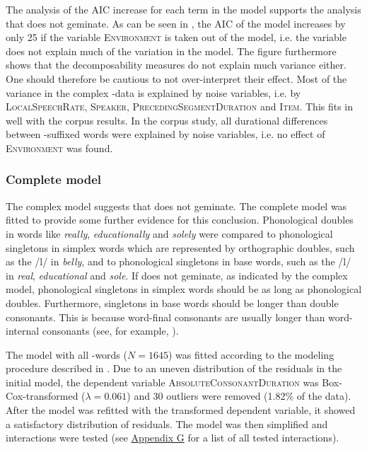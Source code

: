 The analysis of the AIC increase for each term in the model supports the analysis that  does not geminate. As can be seen in , the AIC of the model increases by only 25 if the variable \textsc{Environment} is taken out of the model, i.e. the variable does not explain much of the variation in the model.
The figure furthermore shows that the decomposability measures do not explain much variance either. One should therefore be cautious to not over-interpret their effect. 
Most of the variance in the complex -data is explained by noise variables, i.e. by \textsc{LocalSpeechRate}, \textsc{Speaker}, \textsc{PrecedingSegmentDuration} and \textsc{Item}. This fits in well with the corpus results. In the corpus study, all durational differences between -suffixed words were explained by noise variables, i.e. no effect of \textsc{Environment} was found.




\subsubsection{Complete model}

The complex model suggests that  does not geminate. The complete model was fitted to provide some further evidence for this conclusion. Phonological doubles in words like \textit{really}, \textit{educationally} and \textit{solely} were compared to phonological singletons in simplex words which are represented by orthographic doubles, such as the /l/ in \textit{belly}, and to phonological singletons in base words, such as the /l/ in \textit{real}, \textit{educational} and \textit{sole}. 
If  does not geminate, as indicated by the complex model, phonological singletons in simplex words should be as long as phonological doubles. Furthermore, singletons in base words should be longer than double consonants. This is because word-final consonants are usually longer than word-internal consonants (see, for example,  \citealt{Berkovits.1993,Oller.1973,Umeda.1977}). 


The model with all -words ($N=1645$) was fitted according to the modeling procedure described in . Due to an uneven distribution of the residuals in the initial model, the dependent variable \textsc{AbsoluteConsonantDuration} was Box-Cox-transformed ($\lambda = 0.061$) and 30 outliers were removed (1.82\% of the data).
After the model was refitted with the transformed dependent variable, it showed a satisfactory distribution of residuals.  The model was then simplified and interactions were tested (see \hyperref[Appendix G Summaries of tested interactions in experimental study]{Appendix G} for a list of all tested interactions).



